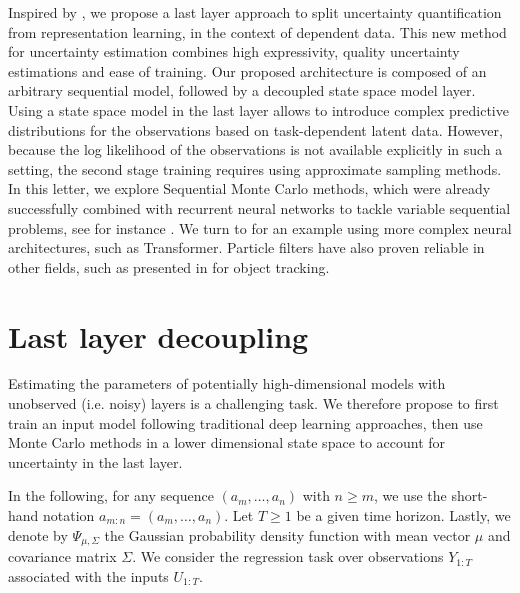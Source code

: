 \documentclass[journal]{IEEEtran}
\begin{document}
Inspired by \cite{Brosse2020OnLA}, we propose a last layer approach to split uncertainty quantification from representation learning, in the context of dependent data. This new method for uncertainty estimation combines high expressivity, quality uncertainty estimations and ease of training. Our proposed architecture is composed of an arbitrary sequential model, followed by a decoupled state space model layer. Using a state space model in the last layer allows to introduce complex predictive distributions for the observations based on task-dependent latent data. However, because the log likelihood of the observations is not available explicitly in such a setting, the second stage training requires using approximate sampling methods. In this letter, we explore Sequential Monte Carlo methods, which were already successfully combined with recurrent neural networks to tackle variable sequential problems, see for instance \cite{Ma2020}.
We turn to \cite{Martin2020TheMC} for an example using more complex neural architectures, such as Transformer.
Particle filters have also proven reliable in other fields, such as presented in \cite{Liu2020LSTMPF} for object tracking.




\section{Last layer decoupling}
Estimating the parameters of potentially high-dimensional models with unobserved (i.e. noisy) layers is a challenging task.
We therefore propose to first train an input model following traditional deep learning approaches, then use Monte Carlo methods in a lower dimensional state space to account for uncertainty in the last layer.

In the following, for any sequence $(a_m,\ldots, a_n)$ with $n\geq m$, we use the short-hand notation $a_{m:n} = (a_m,\ldots, a_n)$.
Let $T\ge 1$ be a given time horizon.
Lastly, we denote by $\Psi_{\mu, \Sigma}$ the Gaussian probability density function with mean vector $\mu$ and covariance matrix $\Sigma$.
We consider the regression task over observations $Y_{1:T}$ associated with the inputs $U_{1:T}$.
\end{document}
